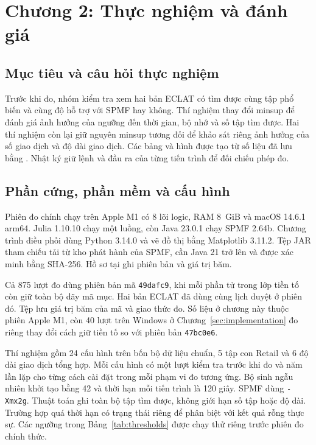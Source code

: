 \section{Chương 2: Thực nghiệm và đánh giá}
\label{sec:evaluation}

\subsection{Mục tiêu và câu hỏi thực nghiệm}
Trước khi đo, nhóm kiểm tra xem hai bản ECLAT có tìm được cùng tập phổ
biến và cùng độ hỗ trợ với SPMF hay không. Thí nghiệm thay đổi minsup
để đánh giá ảnh hưởng của ngưỡng đến thời gian, bộ nhớ và số tập tìm
được. Hai thí nghiệm còn lại giữ nguyên minsup tương đối để khảo sát
riêng ảnh hưởng của số giao dịch và độ dài giao dịch. Các bảng và
hình được tạo từ số liệu đã lưu bằng .
Nhật ký giữ lệnh và đầu ra của từng tiến trình để đối chiếu phép đo.

\subsection{Phần cứng, phần mềm và cấu hình}
Phiên đo chính chạy trên Apple M1 có 8 lõi logic, RAM 8~GiB và macOS
14.6.1 arm64. Julia 1.10.10 chạy một luồng, còn Java 23.0.1 chạy
SPMF 2.64b. Chương trình điều phối dùng Python 3.14.0 và vẽ đồ thị
bằng Matplotlib 3.11.2. Tệp JAR tham chiếu tải từ kho phát hành của
SPMF, cần Java 21 trở lên và được xác minh bằng SHA-256. Hồ sơ tại
 ghi phiên bản và giá trị băm.

Cả 875 lượt đo dùng phiên bản mã \texttt{49dafc9}, khi mỗi phần tử
trong lớp tiền tố còn giữ toàn bộ dãy mã mục. Hai bản ECLAT đã dùng
cùng lịch duyệt ở phiên đó. Tệp 
lưu giá trị băm của mã và giao thức đo. Số liệu ở chương này thuộc
phiên Apple M1, còn 40 lượt trên Windows ở Chương~\ref{sec:implementation}
đo riêng thay đổi cách giữ tiền tố so với phiên bản \texttt{47bc0e6}.

Thí nghiệm gồm 24 cấu hình trên bốn bộ dữ liệu chuẩn, 5 tập con Retail
và 6 độ dài giao dịch tổng hợp. Mỗi cấu hình có một lượt kiểm tra
trước khi đo và năm lần lặp cho từng cách cài đặt trong mỗi phạm vi
đo tương ứng. Bộ sinh ngẫu nhiên khởi tạo bằng 42 và thời hạn mỗi tiến trình
là 120 giây. SPMF dùng \texttt{-Xmx2g}. Thuật toán ghi toàn bộ tập
tìm được, không giới hạn số tập hoặc độ dài. Trường hợp quá thời hạn
có trạng thái riêng để phân biệt với kết quả rỗng thực sự. Các ngưỡng
trong Bảng~\ref{tab:thresholds} được chạy thử riêng trước phiên đo
chính thức.

